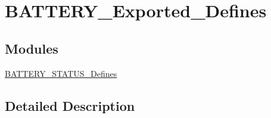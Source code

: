 \hypertarget{group___b_a_t_t_e_r_y___exported___defines}{}\section{B\+A\+T\+T\+E\+R\+Y\+\_\+\+Exported\+\_\+\+Defines}
\label{group___b_a_t_t_e_r_y___exported___defines}
\subsection*{Modules}
\begin{DoxyCompactItemize}
\item 
\mbox{\hyperlink{group___b_a_t_t_e_r_y___s_t_a_t_u_s___defines}{B\+A\+T\+T\+E\+R\+Y\+\_\+\+S\+T\+A\+T\+U\+S\+\_\+\+Defines}}
\end{DoxyCompactItemize}


\subsection{Detailed Description}
